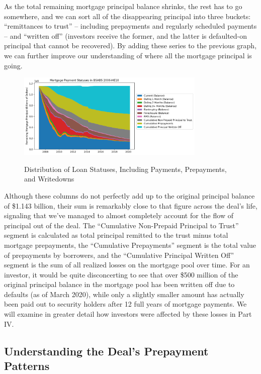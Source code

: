 \documentclass[12pt]{article}
\begin{document}
	As the total remaining mortgage principal balance shrinks, the rest has to go somewhere, and we can sort all of the disappearing principal into three buckets: “remittances to trust” – including prepayments and regularly scheduled payments – and “written off” (investors receive the former, and the latter is defaulted-on principal that cannot be recovered). By adding these series to the previous graph, we can further improve our understanding of where all the mortgage principal is going.


\begin{figure}[h]
	\centering
	\caption{Distribution of Loan Statuses, Including Payments, Prepayments, and Writedowns}
	\includegraphics[width=0.8\textwidth]{../figures/stackplot_delinq_status_with_writeoffs}
	\label{fig:stackplot_delinq_status_with_writeoffs}
\end{figure}

Although these columns do not perfectly add up to the original principal balance of \$1.143 billion, their sum is remarkably close to that figure across the deal’s life, signaling that we’ve managed to almost completely account for the flow of principal out of the deal. The “Cumulative Non-Prepaid Principal to Trust” segment is calculated as total principal remitted to the trust minus total mortgage prepayments, the “Cumulative Prepayments” segment is the total value of prepayments by borrowers, and the “Cumulative Principal Written Off” segment is the sum of all realized losses on the mortgage pool over time. For an investor, it would be quite disconcerting to see that over \$500 million of the original principal balance in the mortgage pool has been written off due to defaults (as of March 2020), while only a slightly smaller amount has actually been paid out to security holders after 12 full years of mortgage payments. We will examine in greater detail how investors were affected by these losses in Part IV.


\subsection*{Understanding the Deal's Prepayment Patterns}
\end{document}

